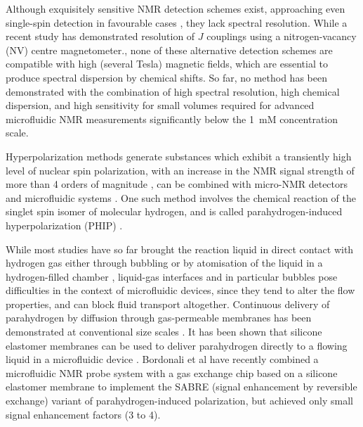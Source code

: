 Although exquisitely sensitive NMR detection schemes exist,
approaching even single-spin detection in favourable cases
\cite{Rugar:1992dm,Rugar:2004bc,Mamin:2007ff,Poggio:2010jf,
Maze:2008cs,Staudacher:2013kn,Rugar:2015by,McDermott:2002hp,
Budker:2007hz,Xu:2006kg,Blanchard:2013gs}, they lack spectral resolution.
While a recent study
has demonstrated resolution of $J$ couplings using a nitrogen-vacancy
(NV) centre magnetometer.\cite{Glenn:2018ct}, none of these
alternative detection schemes are compatible with high (several Tesla)
magnetic fields, which are essential to produce spectral dispersion
by chemical shifts.
So far, no method has been demonstrated with the combination of high
spectral resolution, high chemical dispersion,
and high sensitivity for small volumes required for
advanced microfluidic NMR measurements significantly
below the 1~mM concentration scale.

Hyperpolarization methods generate substances which exhibit a transiently high
level of nuclear spin polarization, with an increase in the NMR signal strength
of more than 4 orders of magnitude \cite{munnemann2011nuclear}, can be combined
with micro-NMR detectors and microfluidic systems \cite{McDonnell:2005dn,Desvaux:2009bq,Telkki:2010vg,Paciok:2011ek,JimenezMartinez:2014et,Causier:2015fg,eills-hale2018EuromarPHIP,Bordonali:2019jqa}.
One such method
involves the chemical reaction of the singlet spin isomer of molecular
hydrogen, and is called parahydrogen-induced hyperpolarization (PHIP)
\cite{hovener2018parahydrogen,duckett2012application,gloggler2013hydrogen,green2012theory}.

While most studies have so far brought the reaction liquid in direct contact
with hydrogen gas either through bubbling or by atomisation of the liquid
in a hydrogen-filled chamber \cite{bhattacharya2007towards,chekmenev2008pasadena,
chekmenev2009hyperpolarized,shchepin2014parahydrogen,
Reineri:2015he,cavallari201813,eills2017singlet},
liquid-gas interfaces and in particular bubbles
pose difficulties in the context of microfluidic devices, since they tend
to alter the flow properties, and can block fluid transport altogether.
Continuous delivery of parahydrogen by diffusion through
gas-permeable membranes has been demonstrated at
conventional size scales \cite{Roth:2010hk,Lehmkuhl:2018cd}.
It has been shown that silicone elastomer membranes can be used
to deliver parahydrogen directly to a flowing liquid in a microfluidic
device \cite{eills-hale2018EuromarPHIP}. Bordonali et al\cite{Bordonali:2019jqa} have
recently combined a microfluidic NMR probe system with a gas exchange
chip based on a silicone elastomer membrane to implement the SABRE (signal
enhancement by reversible exchange) variant of parahydrogen-induced polarization,
but achieved only small signal enhancement factors (3 to 4).

